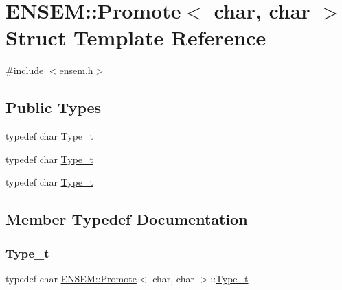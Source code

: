 \hypertarget{structENSEM_1_1Promote_3_01char_00_01char_01_4}{}\section{E\+N\+S\+EM\+:\+:Promote$<$ char, char $>$ Struct Template Reference}
\label{structENSEM_1_1Promote_3_01char_00_01char_01_4}


{\ttfamily \#include $<$ensem.\+h$>$}

\subsection*{Public Types}
\begin{DoxyCompactItemize}
\item 
typedef char \mbox{\hyperlink{structENSEM_1_1Promote_3_01char_00_01char_01_4_a3353ceefb3e26f60983a352e42d691ed}{Type\+\_\+t}}
\item 
typedef char \mbox{\hyperlink{structENSEM_1_1Promote_3_01char_00_01char_01_4_a3353ceefb3e26f60983a352e42d691ed}{Type\+\_\+t}}
\item 
typedef char \mbox{\hyperlink{structENSEM_1_1Promote_3_01char_00_01char_01_4_a3353ceefb3e26f60983a352e42d691ed}{Type\+\_\+t}}
\end{DoxyCompactItemize}


\subsection{Member Typedef Documentation}
\mbox{\label{structENSEM_1_1Promote_3_01char_00_01char_01_4_a3353ceefb3e26f60983a352e42d691ed}} 
\subsubsection{\texorpdfstring{Type\_t}{Type\_t}\hspace{0.1cm}{\footnotesize\ttfamily [1/3]}}
{\footnotesize\ttfamily typedef char \mbox{\hyperlink{structENSEM_1_1Promote}{E\+N\+S\+E\+M\+::\+Promote}}$<$ char, char $>$\+::\mbox{\hyperlink{structENSEM_1_1Promote_3_01char_00_01char_01_4_a3353ceefb3e26f60983a352e42d691ed}{Type\+\_\+t}}}

\mbox{\label{structENSEM_1_1Promote_3_01char_00_01char_01_4_a3353ceefb3e26f60983a352e42d691ed}} 
